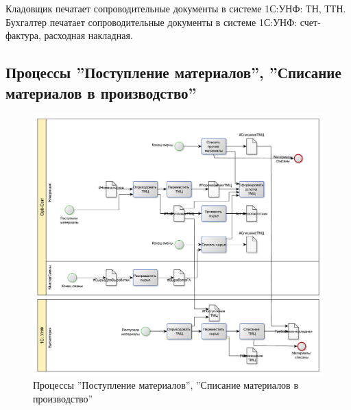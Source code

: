 
Кладовщик печатает сопроводительные документы в системе 1С:УНФ: ТН, ТТН.
Бухгалтер печатает сопроводительные документы в системе 1С:УНФ: счет-фактура, расходная накладная.



\subsection{Процессы ''Поступление материалов'', ''Списание материалов в производство''}
%
\begin{figure}
\begin{center}
  \includegraphics[angle=90, height=0.8\textheight, keepaspectratio]{Pics/6_Warehouse.pdf}
\end{center}
  \caption{Процессы ''Поступление материалов'', ''Списание материалов в производство''}
  \label{pic:Schema_6}
\end{figure}


